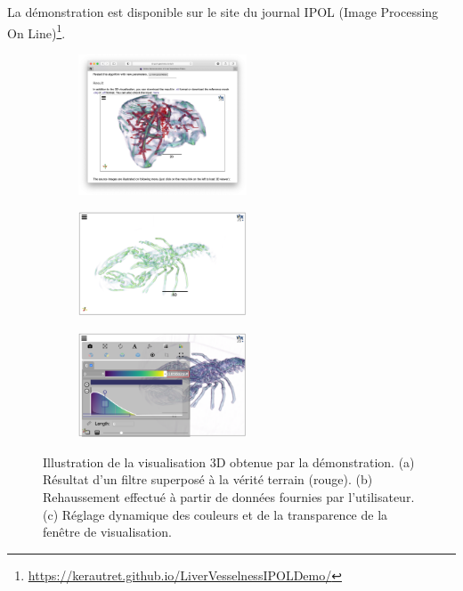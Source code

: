 La démonstration est disponible sur le site du journal IPOL (Image Processing On Line)\footnote{\url{ https://kerautret.github.io/LiverVesselnessIPOLDemo/}}. 

\begin{figure}[!t]
\noindent   
\centering
    \begin{subfigure}{0.33\textwidth}
        \centering
        \includegraphics[width=5cm, trim= 4.7cm 5cm 4.7cm 8.5cm, clip=true]{Images/visuDemoViewer.png}
        \caption{ }
    \end{subfigure}
    \begin{subfigure}{0.33\textwidth}
        \centering
        \includegraphics[width=5cm]{Images/visuDemoViewerExtract.png}
        \caption{ }
    \end{subfigure}
    \begin{subfigure}{0.33\textwidth}
        \centering
        \includegraphics[width=5cm]{Images/visuDemoViewerExtract2.png}
        \caption{ }
    \end{subfigure}

  \caption{Illustration de la visualisation 3D obtenue par la démonstration. (a) Résultat d'un filtre superposé à la vérité terrain (rouge). (b) Rehaussement effectué à partir de données fournies par l'utilisateur. (c) Réglage dynamique des couleurs et de la transparence de la fenêtre de visualisation.}
\label{fig:Illustr3D}
\end{figure}

